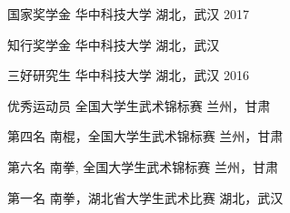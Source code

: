 


\vspace{-1.5mm}
\begin{cvhonors}

\cvhonor
{国家奖学金} %
{华中科技大学} %
{湖北，武汉} %
{2017} %

\cvhonor
{知行奖学金} %
{华中科技大学} %
{湖北，武汉} %
{} %


\cvhonor
{三好研究生} %
{华中科技大学} %
{湖北，武汉} %
{2016} %




\cvhonor
{优秀运动员} %
{全国大学生武术锦标赛} %
{兰州，甘肃} %
{ } %


\cvhonor
{第四名} %
{南棍，全国大学生武术锦标赛} %
{兰州，甘肃} %
{ } %


\cvhonor
{第六名} %
{南拳, 全国大学生武术锦标赛} %
{兰州，甘肃} %
{ } %


\cvhonor
{第一名} %
{南拳，湖北省大学生武术比赛} %
{湖北，武汉} %
{ } %



\end{cvhonors}
